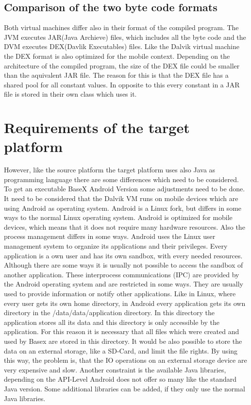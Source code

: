 \subsection{Comparison of the two byte code formats}
\label{sec:comparison-of-the-two-byte-code-formats}
Both virtual machines differ also in their format of the compiled program.
The JVM executes JAR(Java Archieve) files, which includes all the byte code and the DVM executes DEX(Davlik Executables) files.
Like the Dalvik virtual machine the DEX format is also optimized for the mobile context.
Depending on the architecture of the compiled program, the size of the DEX file could be smaller than the aquivalent JAR file.
The reason for this is that the DEX file has a shared pool for all constant values.
In opposite to this every constant in a JAR file is stored in their own class which uses it.
\cite{bornstein2008dalvik}



\section{Requirements of the target platform}
\label{sec:migration:requirmenets-of.the-target-platform}
However, like the source platform the target platform uses also Java as programming language there are some differences which need to be considered.
To get an executable BaseX Android Version some adjustments need to be done.
It need to be considered that the Dalvik VM runs on mobile devices which are using Android as operating system.
Android is a Linux fork, but differs in some ways to the normal Linux operating system.
Android is optimized for mobile devices, which means that it does not require many hardware resources.
Also the process management differs in some ways. 
Android uses the Linux user management system to organize its applications and their privileges.
Every application is a own user and has its own sandbox, with every needed resources.
Although there are some ways it is usually not possible to access the sandbox of another application.
These interprocess communications (IPC) are provided by the Android operating system and are restricted in some ways.
They are usually used to provide information or notify other applications.
Like in Linux, where every user gets its own home directory, in Android every application gets its own directory in the /data/data/application directory.
In this directory the application stores all its data and this directory is only accessible by the application.
For this reason it is necessary that all files which were created and used by Basex are stored in this directory.
It would be also possible to store the data on an external storage, like a SD-Card, and limit the file rights.
By using this way, the problem is, that the IO operations on an external storage device are very expensive and slow.
Another constraint is the available Java libraries, depending on the API-Level Android does not offer so many like the standard Java version.
Some additional libraries can be added, if they only use the normal Java libraries.

